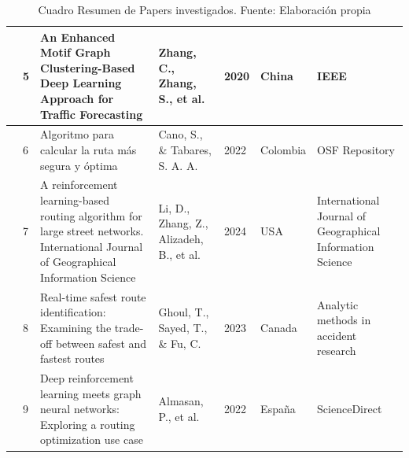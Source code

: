 \begin{table}[h]
\begin{tabular}{|m{0.5cm}|m{0.3cm}|m{4cm}|m{2cm}|m{0.6cm}|m{1.7cm}|m{3cm}|}
		\cline{2-7}
		& 5                                             & An Enhanced Motif Graph Clustering-Based Deep Learning Approach for Traffic Forecasting                                                                               & Zhang, C., Zhang, S., et al.                                          & 2020                                        & China                                          & IEEE                                                            \\ 
		\hline
		\multirow{4}{*}[-28ex]{\rotcell{\rlap{Técnica}}}                                          & 6                                             & Algoritmo para calcular la ruta más segura y óptima                   & Cano, S., \& Tabares, S. A. A.                                      & 2022                                       & Colombia                                        & OSF Repository  \\ 
		\cline{2-7}
		& 7                                             & A reinforcement learning-based routing algorithm for large street networks. International Journal of Geographical Information Science                                                    & Li, D., Zhang, Z., Alizadeh, B., et al.          & 2024                                        & USA                                        & International Journal of Geographical Information Science              \\ 
		\cline{2-7}
		& 8                                             & Real-time safest route identification: Examining the trade-off between safest and fastest routes & Ghoul, T., Sayed, T., \& Fu, C.             & 2023                                        & Canada                                         & Analytic methods in accident research              \\ 
		\cline{2-7}
		& 9                                             & Deep reinforcement learning meets graph neural networks: Exploring a routing optimization use case  & Almasan, P., et al.                                    & 2022                                        & España                                          & ScienceDirect                         \\
		\hline
	\end{tabular}
	\caption{Cuadro Resumen de Papers investigados. Fuente: Elaboración propia}
\label{A:table}
\end{table}




